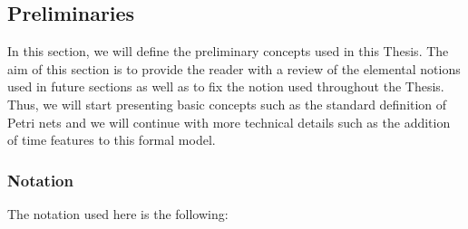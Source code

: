 \subsection*{Preliminaries}
In this section, we will define the preliminary concepts
used in this Thesis. The aim of this section is to provide the reader
with a review of the elemental notions used in future sections
as well as to fix the notion used throughout the Thesis.
Thus, we will start presenting basic concepts such as the standard definition of Petri
nets and we will continue with more technical details such as the addition of time features
to this formal model.


\subsubsection{Notation}
The notation used here is the following:

